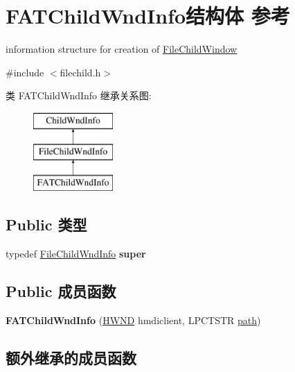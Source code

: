 \hypertarget{struct_f_a_t_child_wnd_info}{}\section{F\+A\+T\+Child\+Wnd\+Info结构体 参考}
\label{struct_f_a_t_child_wnd_info}


information structure for creation of \hyperlink{struct_file_child_window}{File\+Child\+Window}  




{\ttfamily \#include $<$filechild.\+h$>$}

类 F\+A\+T\+Child\+Wnd\+Info 继承关系图\+:\begin{figure}[H]
\begin{center}
\leavevmode
\includegraphics[height=3.000000cm]{struct_f_a_t_child_wnd_info}
\end{center}
\end{figure}
\subsection*{Public 类型}
\begin{DoxyCompactItemize}
\item 
\mbox{\label{struct_f_a_t_child_wnd_info_a831007dbccd16b650a1bd600711fc3a0}} 
typedef \hyperlink{struct_file_child_wnd_info}{File\+Child\+Wnd\+Info} {\bfseries super}
\end{DoxyCompactItemize}
\subsection*{Public 成员函数}
\begin{DoxyCompactItemize}
\item 
\mbox{\label{struct_f_a_t_child_wnd_info_a0701c4603832fee300081dac0612fd3b}} 
{\bfseries F\+A\+T\+Child\+Wnd\+Info} (\hyperlink{interfacevoid}{H\+W\+ND} hmdiclient, L\+P\+C\+T\+S\+TR \hyperlink{structpath}{path})
\end{DoxyCompactItemize}
\subsection*{额外继承的成员函数}


